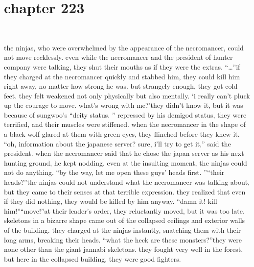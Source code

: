 \section{chapter 223}

                             




the ninjas, who were overwhelmed by the appearance of the necromancer, could not move recklessly.
 even while the necromancer and the president of hunter company were talking, they shut their mouths as if they were the extras.
“…”if they charged at the necromancer quickly and stabbed him, they could kill him right away, no matter how strong he was.
but strangely enough, they got cold feet.
 they felt weakened not only physically but also mentally.
‘i really can’t pluck up the courage to move.
 what’s wrong with me?’they didn’t know it, but it was because of sungwoo’s “deity status.
” repressed by his demigod status, they were terrified, and their muscles were stiffened.
 when the necromancer in the shape of a black wolf glared at them with green eyes, they flinched before they knew it.
“oh, information about the japanese server? sure, i’ll try to get it,” said the president.
when the necromancer said that he chose the japan server as his next hunting ground, he kept nodding.
 even at the insulting moment, the ninjas could not do anything.
“by the way, let me open these guys’ heads first.
”“their heads?”the ninjas could not understand what the necromancer was talking about, but they came to their senses at that terrible expression.
 they realized that even if they did nothing, they would be killed by him anyway.
“damn it! kill him!”“move!”at their leader’s order, they reluctantly moved, but it was too late.
 skeletons in a bizarre shape came out of the collapsed ceilings and exterior walls of the building.
they charged at the ninjas instantly, snatching them with their long arms, breaking their heads.
“what the heck are these monsters?”they were none other than the giant jannabi skeletons.
 they fought very well in the forest, but here in the collapsed building, they were good fighters.

